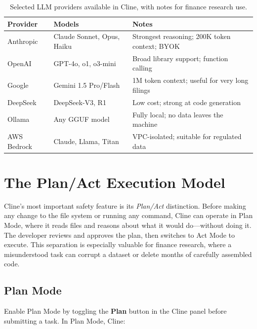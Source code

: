\begin{table}[ht]
\centering
\caption{Selected LLM providers available in Cline, with notes for finance
research use.}
\label{tab:cline-providers}
\begin{tabular}{llp{6cm}}
\toprule
\textbf{Provider} & \textbf{Models} & \textbf{Notes} \\
\midrule
Anthropic   & Claude Sonnet, Opus, Haiku & Strongest reasoning; 200K token context; BYOK \\
OpenAI      & GPT-4o, o1, o3-mini        & Broad library support; function calling \\
Google      & Gemini 1.5 Pro/Flash       & 1M token context; useful for very long filings \\
DeepSeek    & DeepSeek-V3, R1            & Low cost; strong at code generation \\
Ollama      & Any GGUF model             & Fully local; no data leaves the machine \\
AWS Bedrock & Claude, Llama, Titan       & VPC-isolated; suitable for regulated data \\
\bottomrule
\end{tabular}
\end{table}

\section{The Plan/Act Execution Model}
\label{app:cline:plan-act}

\begin{context}
Cline's most important safety feature is its \emph{Plan/Act} distinction.
Before making any change to the file system or running any command, Cline
can operate in Plan Mode, where it reads files and reasons about what it
would do---without doing it.  The developer reviews and approves the plan,
then switches to Act Mode to execute.  This separation is especially
valuable for finance research, where a misunderstood task can corrupt a
dataset or delete months of carefully assembled code.
\end{context}

\subsection{Plan Mode}
\label{app:cline:plan-mode}

Enable Plan Mode by toggling the \textbf{Plan} button in the Cline panel
before submitting a task.  In Plan Mode, Cline:

